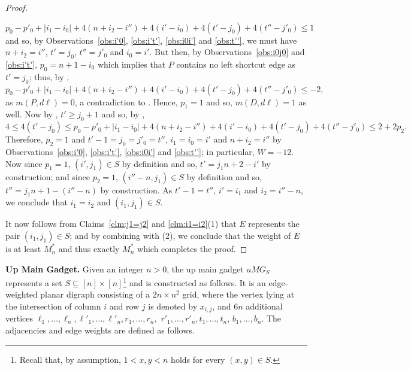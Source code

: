 \begin{proof}
\begin{claimproof}
\[
 p_0 - p'_0 + |i_1-i_0| + 4(n+i_2-i'') + 4(i'-i_0) + 4(t'-j_0) + 4(t''-j'_0) \leq 1
\]
and so, by Observations~\ref{obs:i'0}, \ref{obs:i't'}, \ref{obs:i0i'} and \ref{obs:t''}, we must have $n+i_2 = i''$, $t' = j_0$, $t'' = j'_0$ and $i_0 = i'$. But then, by Observations~\ref{obs:i0j0} and \ref{obs:i't'}, $p_0 = n+1-i_0$ which implies that $P$ contains no left shortcut edge as $t'=j_0$; thus, by ,  
\[
 p_0 - p'_0 + |i_1-i_0| + 4(n+i_2-i'') + 4(i'-i_0) + 4(t'-j_0) + 4(t''-j'_0) \leq -2,
\]
as $m(P,d\ell) = 0$, a contradiction to . Hence, $p_1 = 1$ and so, $m(D,d\ell) = 1$ as well. Now by , $t' \geq j_0+1$ and so, by ,
\[
4 \leq 4(t'-j_0) \leq p_0 - p'_0 + |i_1-i_0| + 4(n+i_2-i'') + 4(i'-i_0)+ 4(t'-j_0) + 4(t''-j'_0) \leq 2 + 2p_2.
\]
Therefore, $p_2 = 1$ and $t'-1=j_0=j'_0=t''$, $i_1=i_0=i'$ and $n+i_2=i''$ by Observations~\ref{obs:i'0}, \ref{obs:i't'}, \ref{obs:i0i'} and \ref{obs:t''}; in particular, $W = -12$. Now since $p_1 = 1$, $(i',j_1) \in S$ by definition and so, $t' = j_1n+2 - i'$ by construction; and since $p_2 = 1$, $(i''-n,j_1) \in S$ by definition and so, $t''= j_1n+1-(i''-n)$ by construction. As $t' -1 = t''$, $i' = i_1$ and $i_2 = i''-n$, we conclude that $i_1 = i_2$ and $(i_1,j_1) \in S$. 
\end{claimproof}

It now follows from Claims~\ref{clm:j1=j2} and \ref{clm:i1=i2}(1) that $E$ represents the pair $(i_1,j_1) \in S$; and by combining  with (2), we conclude that the weight of $E$ is at least $M_n^*$ and thus exactly $M_n^*$ which completes the proof.
\end{proof}


\noindent
\textbf{Up Main Gadget.} Given an integer $n > 0$, the up main gadget $uMG_S$ represents a set $S \subseteq [n] \times [n]$\footnote{Recall that, by assumption, $1 < x,y< n$ holds for every $(x,y) \in S$.} and is constructed as follows. It is an edge-weighted planar digraph consisting of a $2n \times n^2$ grid, where the vertex lying at the intersection of column $i$ and row $j$ is denoted by $x_{i,j}$, and $6n$ additional vertices $\ell_1,\ldots,\ell_n,\ell'_1,\ldots,\ell'_n,r_1,\ldots,r_n,$ $r'_1,\ldots,r'_n,t_1,\ldots,t_n$, $b_1,\ldots,b_n$. The adjacencies and edge weights are defined as follows. 

